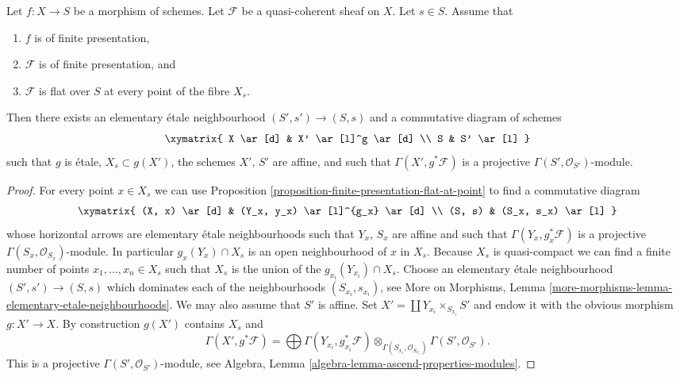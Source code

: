 \begin{lemma}
\label{lemma-finite-presentation-flat-along-fibre}
Let $f : X \to S$ be a morphism of schemes.
Let $\mathcal{F}$ be a quasi-coherent sheaf on $X$.
Let $s \in S$.
Assume that
\begin{enumerate}
\item $f$ is of finite presentation,
\item $\mathcal{F}$ is of finite presentation, and
\item $\mathcal{F}$ is flat over $S$ at every point of the fibre $X_s$.
\end{enumerate}
Then there exists an elementary \'etale neighbourhood
$(S', s') \to (S, s)$ and a commutative diagram of schemes
$$
\xymatrix{
X \ar[d] & X' \ar[l]^g \ar[d] \\
S & S' \ar[l]
}
$$
such that $g$ is \'etale, $X_s \subset g(X')$, the schemes
$X'$, $S'$ are affine, and such that
$\Gamma(X', g^*\mathcal{F})$ is a projective
$\Gamma(S', \mathcal{O}_{S'})$-module.
\end{lemma}

\begin{proof}
For every point $x \in X_s$ we can use
Proposition \ref{proposition-finite-presentation-flat-at-point}
to find a commutative diagram
$$
\xymatrix{
(X, x) \ar[d] & (Y_x, y_x) \ar[l]^{g_x} \ar[d] \\
(S, s) & (S_x, s_x) \ar[l]
}
$$
whose horizontal arrows are elementary \'etale neighbourhoods
such that $Y_x$, $S_x$ are affine and such that
$\Gamma(Y_x, g_x^*\mathcal{F})$ is a projective
$\Gamma(S_x, \mathcal{O}_{S_x})$-module. In particular
$g_x(Y_x) \cap X_s$ is an open neighbourhood of $x$ in $X_s$.
Because $X_s$ is quasi-compact we can find a finite number of points
$x_1, \ldots, x_n \in X_s$ such that $X_s$ is the union of
the $g_{x_i}(Y_{x_i}) \cap X_s$. Choose an elementary \'etale neighbourhood
$(S' , s') \to (S, s)$ which dominates each of the neighbourhoods
$(S_{x_i}, s_{x_i})$, see
More on Morphisms,
Lemma \ref{more-morphisms-lemma-elementary-etale-neighbourhoods}.
We may also assume that $S'$ is affine.
Set $X' = \coprod Y_{x_i} \times_{S_{x_i}} S'$ and endow it with the
obvious morphism $g : X' \to X$.
By construction $g(X')$ contains $X_s$ and
$$
\Gamma(X', g^*\mathcal{F})
=
\bigoplus \Gamma(Y_{x_i}, g_{x_i}^*\mathcal{F})
\otimes_{\Gamma(S_{x_i}, \mathcal{O}_{S_{x_i}})}
\Gamma(S', \mathcal{O}_{S'}).
$$
This is a projective $\Gamma(S', \mathcal{O}_{S'})$-module, see
Algebra, Lemma \ref{algebra-lemma-ascend-properties-modules}.
\end{proof}

